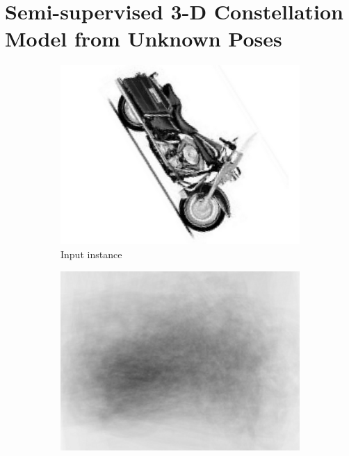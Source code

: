 \chapter{Semi-supervised 3-D Constellation Model from Unknown Poses}
\label{chap/3dreg}


\begin{figure}[ht]
\centering
\begin{subfigure}[b]{0.19\linewidth}
	\includegraphics[width=\linewidth]{fig/3dreg/onebike_before2.png}
	\caption{Input instance}
	\label{fig:concept1}
\end{subfigure}
\begin{subfigure}[b]{0.19\linewidth}
	\includegraphics[width=\linewidth]{fig/3dreg/avgbike_before.png}

\end{subfigure}
\end{figure}
